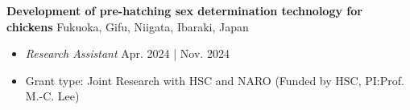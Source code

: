 \documentclass[a4paper,9pt]{extarticle}
\begin{document}
\noindent 
\textbf{Development of pre-hatching sex determination technology for chickens} \hfill Fukuoka, Gifu, Niigata, Ibaraki, Japan %
\begin{itemize}
    \item \textit{Research Assistant} \hfill Apr. 2024 | Nov. 2024
    \item Grant type: Joint Research with HSC and NARO (Funded by HSC, PI:Prof. M.-C. Lee) 
    
\end{itemize}
\end{document}
